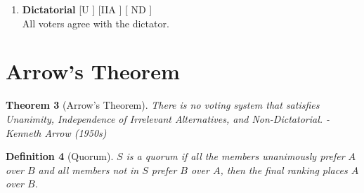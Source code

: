 \documentclass[twoside]{article}
\newcounter{lecnum}
\newtheorem{theorem}{Theorem}[lecnum]
\newtheorem{definition}[theorem]{Definition}
\begin{document}
\begin{enumerate}
\begin{center}
\end{center}

In the depiction above, which is comparing two elements at a time, and then comparing the winner to the next element, demonstrates the problem.  Outcomes will vary simply based on what order you perform your comparison.

\begin{definition}[Social Choice]
The top most choice.
\end{definition}
\begin{definition}[Social Welfare]
The complete ranking of all choices.
\end{definition}

Note: Each definition above can be deduced from the other...
    
    \item \textbf{Dictatorial}  [U \cmark] [IIA \cmark ] [ ND \xmark ]
    \\All voters agree with the dictator.
    
\end{enumerate}

\section{Arrow's Theorem}

\begin{theorem}[Arrow's Theorem]
There is no voting system that satisfies Unanimity, Independence of Irrelevant Alternatives, and Non-Dictatorial. - Kenneth Arrow (1950s)
\end{theorem}

\begin{definition}[Quorum]
$S$ is a quorum if all the members unanimously prefer $A$ over $B$ and all members not in $S$ prefer $B$ over $A$, then the final ranking places $A$ over $B$.
\end{definition}
\end{document}

